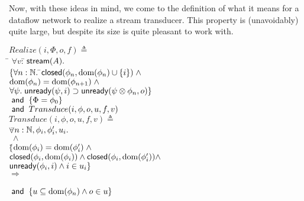 \documentclass[preprint,natbib]{sigplanconf}
\begin{document}
Now, with these ideas in mind, we come to the definition of what it
means for a dataflow network to realize a stream transducer. This
property is (unavoidably) quite large, but despite its size is quite
pleasant to work with.
\begin{tabbing}
$Realize(i, \Phi, o, f) \triangleq$ \\
\;\;\= $\forall v:$\=$\,\mbox{\textsf{{stream}}}({A}).\;$  \\
\>\> $\{\forall n:\mathbb{N}.\;$\=$\mbox{\textsf{{closed}}}({\phi_n}, {\mbox{dom}({\phi_n}) \cup \{{i}\}}) \;\land$ \\
\>\>\>$\mbox{dom}({\phi_n}) = \mbox{dom}({\phi_{n+1}})\; \land$ \\
\>\>\>$\forall \psi.\; \mbox{\textsf{{unready}}}({\psi}, {i}) \supset \mbox{\textsf{{unready}}}({\psi \otimes \phi_n}, {o})\}$ \\
\>\> $\;\mbox{\textsf{{and}}}\; \; \{\Phi = \phi_0\}$ \\
\>\> $\;\mbox{\textsf{{and}}}\; \;  Transduce(i, \phi, o, u, f, v)$ \\[1em]


$Transduce(i, \phi, o, u, f, v) \triangleq$ \\
\> $\forall $\=$ n:\mathbb{N}, \phi_i, \phi'_i, u_i.$ \\
\>\>  $\; \land$ \\
\>\> $\{$\=$\mbox{dom}({\phi_i}) = \mbox{dom}({\phi'_i}) \;\land $ \\
\>\>     \>$\mbox{\textsf{{closed}}}({\phi_i}, {\mbox{dom}({\phi_i})}) \land 
            \mbox{\textsf{{closed}}}({\phi_i}, {\mbox{dom}({\phi'_i})}) \land $ \\
\>\>     \>$\mbox{\textsf{{unready}}}({\phi_i}, {i}) \land
            i \in u_i\}$ \\
\>\> $\Longrightarrow$ \\
\>\>  \\
\>\> $\;\mbox{\textsf{{and}}}\;\; \{u \subseteq \mbox{dom}({\phi_n}) \land o \in u\}$ \\
\end{tabbing}
\end{document}
